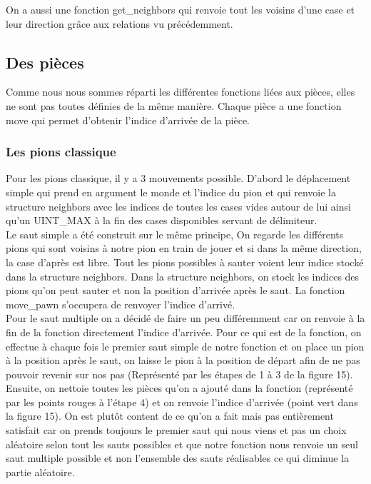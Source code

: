 \documentclass{article}
\begin{document}
On a aussi une fonction get\_neighbors qui renvoie tout les voisins d'une case et leur direction grâce aux relations vu précédemment.


\subsection{Des pièces}

Comme nous nous sommes réparti les différentes fonctions liées aux pièces, elles ne sont pas toutes définies de la même manière. Chaque pièce a une fonction move qui permet d'obtenir l'indice d'arrivée de la pièce.

\subsubsection{Les pions classique}

Pour les pions classique, il y a 3 mouvements possible. D'abord le déplacement simple qui prend en argument le monde et l'indice du pion et qui renvoie la structure neighbors avec les indices de toutes les cases vides autour de lui ainsi qu'un UINT\_MAX à la fin des cases disponibles servant de délimiteur.\\

Le saut simple a été construit sur le même principe, On regarde les différents pions qui sont voisins à notre pion en train de jouer et si dans la même direction, la case d'après est libre. Tout les pions possibles à sauter voient leur indice stocké dans la structure neighbors. Dans la structure neighbors, on stock les indices des pions qu'on peut sauter et non la position d'arrivée après le saut. La fonction move\_pawn s'occupera de renvoyer l'indice d'arrivé.\\



Pour le saut multiple on a décidé de faire un peu différemment car on renvoie à la fin de la fonction directement l'indice d'arrivée. Pour ce qui est de la fonction, on effectue à chaque fois le premier saut simple de notre fonction et on place un pion à la position après le saut, on laisse le pion à la position de départ afin de ne pas pouvoir revenir sur nos pas (Représenté par les étapes de 1 à 3 de la figure 15). Ensuite, on nettoie toutes les pièces qu'on a ajouté dans la fonction (représenté par les points rouges à l'étape 4) et on renvoie l'indice d'arrivée (point vert dans la figure 15). On est plutôt content de ce qu'on a fait mais pas entièrement satisfait car on prends toujours le premier saut qui nous viens et pas un choix aléatoire selon tout les sauts possibles et que notre fonction nous renvoie un seul saut multiple possible et non l'ensemble des sauts réalisables ce qui diminue la partie aléatoire.\\
\end{document}
